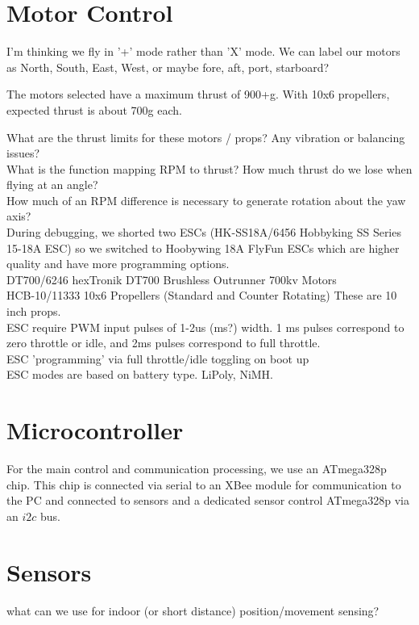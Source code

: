 \documentclass{article}
\begin{document}
\section{Motor Control}
I'm thinking we fly in '+' mode rather than 'X' mode.  We can label our motors as North, South, East, West, or maybe fore, aft, port, starboard?

The motors selected have a maximum thrust of 900+g.  With 10x6 propellers, expected thrust is about 700g each.

What are the thrust limits for these motors / props? Any vibration or balancing issues?\\
What is the function mapping RPM to thrust?  How much thrust do we lose when flying at an angle?\\
How much of an RPM difference is necessary to generate rotation about the yaw axis?\\

During debugging, we shorted two ESCs (HK-SS18A/6456 Hobbyking SS Series 15-18A ESC) so we switched to Hoobywing 18A FlyFun ESCs which are higher quality and have more programming options.\\
DT700/6246 hexTronik DT700 Brushless Outrunner 700kv Motors\\
HCB-10/11333 10x6 Propellers (Standard and Counter Rotating) These are 10 inch props.\\

ESC require PWM input pulses of 1-2us (ms?) width.  1 ms pulses correspond to zero throttle or idle, and 2ms pulses correspond to full throttle.\\
ESC 'programming' via full throttle/idle toggling on boot up\\
ESC modes are based on battery type.  LiPoly, NiMH.\\

\section{Microcontroller}
For the main control and communication processing, we use an ATmega328p chip.  This chip is connected via serial to an XBee module for communication to the PC and connected to sensors and a dedicated sensor control ATmega328p via an $i2c$ bus.

\section{Sensors}
what can we use for indoor (or short distance) position/movement sensing?
\end{document}
